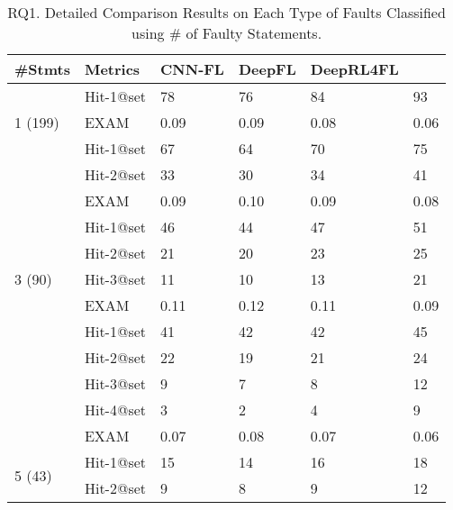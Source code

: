 \begin{table}[t]
	\caption{RQ1. Detailed Comparison Results on Each Type of Faults Classified using \# of Faulty Statements.}
        \vspace{-6pt}
	{\small
		\begin{center}
			\renewcommand{\arraystretch}{1}
			\begin{tabular}{p{1cm}<{\centering}|p{1.33cm}<{\centering}|p{1cm}<{\centering}|p{0.7cm}<{\centering}|p{1.2cm}<{\centering}|p{1.2cm}<{\centering}}
				\hline
				\#Stmts & Metrics & CNN-FL & DeepFL & DeepRL4FL & \tool \\
				\hline
				\multirow{3}{*}{1 (199)}   & Hit-1@set     & 78 & 76 & 84 & 93 \\
							    		 & EXAM          & 0.09 & 0.09 & 0.08 & 0.06 \\
				\hline
				\multirow{4}{*}{2 (142)}  & Hit-1@set     & 67 & 64 & 70 & 75 \\
										& Hit-2@set     & 33 & 30 & 34 & 41 \\
									   	& EXAM          & 0.09 & 0.10 & 0.09 & 0.08 \\
				\hline
				\multirow{5}{*}{3 (90)}  & Hit-1@set     & 46 & 44 & 47 & 51 \\
										& Hit-2@set     & 21 & 20 & 23 & 25\\
										& Hit-3@set     & 11 &10 & 13 & 21 \\
										& EXAM          & 0.11 & 0.12 & 0.11 & 0.09 \\
				\hline
				\multirow{6}{*}{4 (78)}  & Hit-1@set     & 41 & 42 & 42 & 45 \\
										& Hit-2@set     &22 & 19 & 21 & 24 \\
										& Hit-3@set     & 9 & 7 & 8 & 12 \\
										& Hit-4@set     & 3 & 2 & 4 & 9 \\
										& EXAM          & 0.07 & 0.08 & 0.07 & 0.06 \\
				\hline
				\multirow{7}{*}{5 (43)}  & Hit-1@set     & 15 & 14 & 16 & 18 \\
										& Hit-2@set     & 9 & 8 & 9 & 12 \\

\end{tabular}
\end{center}}
\end{table}
